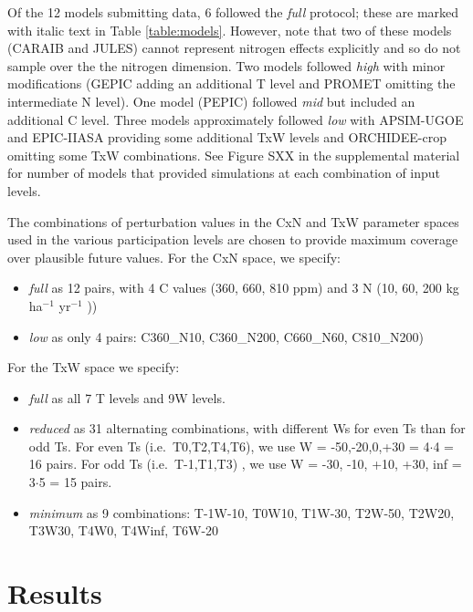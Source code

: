 \documentclass[gmd, manuscript]{copernicus} %
\begin{document}
Of the 12 models submitting data, 6 followed the \textit{full} protocol; these are marked with italic text in Table \ref{table:models}. 
However, note that two of these models (CARAIB and JULES) cannot represent nitrogen effects explicitly and so do not sample over the the nitrogen dimension. 
Two models followed \textit{high} with minor modifications (GEPIC adding an additional T level and PROMET omitting the intermediate N level). 
One model (PEPIC) followed \textit{mid} but included an additional C level. 
Three models approximately followed \textit{low} with APSIM-UGOE and EPIC-IIASA providing some additional TxW levels and ORCHIDEE-crop omitting some TxW combinations.  
See Figure SXX in the supplemental material for number of models that provided simulations at each combination of input levels.

The combinations of perturbation values in the CxN and TxW parameter spaces used in the various participation levels are chosen to provide maximum coverage over plausible future values. For the CxN space, we specify:
\begin{itemize}
\item \textit{full} as 12 pairs, with 4 C values (360, 660, 810 ppm) and 3 N (10, 60, 200 kg ha$^{-1}$ yr$^{-1}$ ))
\item \textit{low} as only 4 pairs: C360\_N10, C360\_N200, C660\_N60, C810\_N200) 
\end{itemize}
    
For the TxW space we specify:
\begin{itemize}
\item \textit{full} as all 7 T levels and 9W levels.
\item \textit{reduced} as 31 alternating combinations, with different Ws for even Ts than for odd Ts. For even Ts (i.e.\ T0,T2,T4,T6), we use W = -50,-20,0,+30 = 4$\cdot$4 = 16 pairs. For odd Ts (i.e.\ T-1,T1,T3) , we use W = -30, -10, +10, +30, inf = 3$\cdot$5 = 15 pairs.
\item \textit{minimum} as 9 combinations: T-1W-10, T0W10, T1W-30, T2W-50, T2W20, T3W30, T4W0, T4Winf, T6W-20
\end{itemize}

\section{Results}
\label{S:4}
\end{document}
